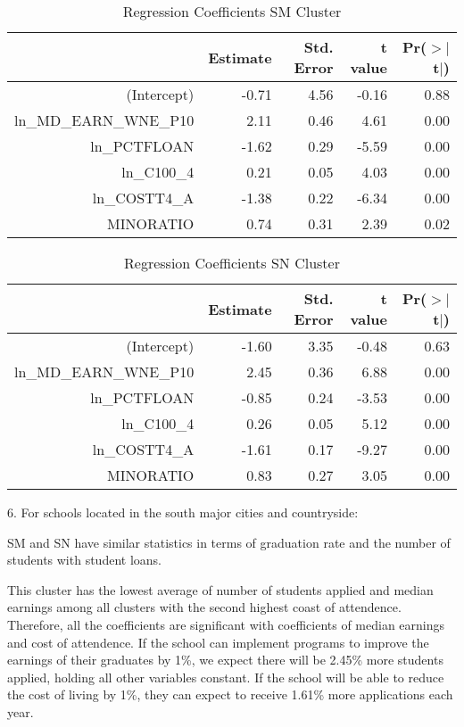 \documentclass{article}
\begin{document}
\begin{Schunk}
\begin{Soutput}
\begin{table}[H]
\centering
\begin{tabular}{rrrrr}
  \hline
 & Estimate & Std. Error & t value & Pr($>$$|$t$|$) \\ 
  \hline
(Intercept) & -0.71 & 4.56 & -0.16 & 0.88 \\ 
  ln\_MD\_EARN\_WNE\_P10 & 2.11 & 0.46 & 4.61 & 0.00 \\ 
  ln\_PCTFLOAN & -1.62 & 0.29 & -5.59 & 0.00 \\ 
  ln\_C100\_4 & 0.21 & 0.05 & 4.03 & 0.00 \\ 
  ln\_COSTT4\_A & -1.38 & 0.22 & -6.34 & 0.00 \\ 
  MINORATIO & 0.74 & 0.31 & 2.39 & 0.02 \\ 
   \hline
\end{tabular}
\caption{Regression Coefficients SM Cluster} 
\end{table}
\end{Soutput}
\begin{Soutput}
\begin{table}[H]
\centering
\begin{tabular}{rrrrr}
  \hline
 & Estimate & Std. Error & t value & Pr($>$$|$t$|$) \\ 
  \hline
(Intercept) & -1.60 & 3.35 & -0.48 & 0.63 \\ 
  ln\_MD\_EARN\_WNE\_P10 & 2.45 & 0.36 & 6.88 & 0.00 \\ 
  ln\_PCTFLOAN & -0.85 & 0.24 & -3.53 & 0.00 \\ 
  ln\_C100\_4 & 0.26 & 0.05 & 5.12 & 0.00 \\ 
  ln\_COSTT4\_A & -1.61 & 0.17 & -9.27 & 0.00 \\ 
  MINORATIO & 0.83 & 0.27 & 3.05 & 0.00 \\ 
   \hline
\end{tabular}
\caption{Regression Coefficients SN Cluster} 
\end{table}
\end{Soutput}
\end{Schunk}

6. For schools located in the south major cities and countryside:

SM and SN have similar statistics in terms of graduation rate and the number of students with student loans.

This cluster has the lowest average of number of students applied and median earnings among all clusters with the second highest coast of attendence. Therefore, all the coefficients are significant with coefficients of median earnings and cost of attendence. If the school can implement programs to improve the earnings of their graduates by 1\%, we expect there will be 2.45\% more students applied, holding all other variables constant. If the school will be able to reduce the cost of living by 1\%, they can expect to receive 1.61\% more applications each year.
\end{document}
